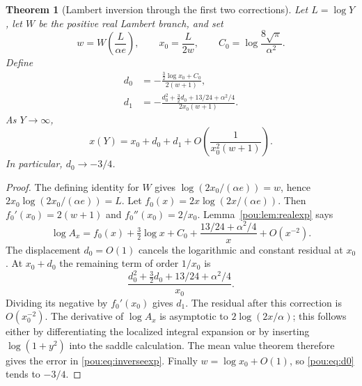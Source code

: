 \documentclass[11pt]{article}
\newtheorem{theorem}{Theorem}[section]
\theoremstyle{definition}
\theoremstyle{remark}
\begin{document}
\begin{theorem}[Lambert inversion through the first two corrections]
\label{pou:thm:inverse}
Let $L=\log Y$, let $W$ be the positive real Lambert branch, and set
\begin{equation}\label{pou:eq:x0}
 w=W\left(\frac{L}{\alpha e}\right),\qquad
 x_0=\frac{L}{2w},\qquad C_0=\log\frac{8\sqrt\pi}{\alpha^2}.
\end{equation}
Define
\begin{align}
 d_0&=-\frac{\tfrac32\log x_0+C_0}{2(w+1)},\label{pou:eq:d0}\\
 d_1&=-\frac{d_0^2+\tfrac32d_0+13/24+\alpha^2/4}
                 {2x_0(w+1)}.\label{pou:eq:d1}
\end{align}
As $Y\to\infty$,
\begin{equation}\label{pou:eq:inverseexp}
 x(Y)=x_0+d_0+d_1+O\left(\frac1{x_0^2(w+1)}\right).
\end{equation}
In particular, $d_0\to-3/4$.
\end{theorem}
\begin{proof}
The defining identity for $W$ \cite{dlmfW} gives
$\log(2x_0/(\alpha e))=w$, hence
$2x_0\log(2x_0/(\alpha e))=L$.
Let $f_0(x)=2x\log(2x/(\alpha e))$.
Then $f_0'(x_0)=2(w+1)$ and $f_0''(x_0)=2/x_0$.
Lemma~\ref{pou:lem:realexp} says
\[
 \log A_x=f_0(x)+\tfrac32\log x+C_0+
             \frac{13/24+\alpha^2/4}{x}+O(x^{-2}).
\]
The displacement $d_0=O(1)$ cancels the logarithmic and constant residual
at $x_0$.  At $x_0+d_0$ the remaining term of order $1/x_0$ is
\[
 \frac{d_0^2+\tfrac32d_0+13/24+\alpha^2/4}{x_0}.
\]
Dividing its negative by $f_0'(x_0)$ gives $d_1$.
The residual after this correction is $O(x_0^{-2})$.
The derivative of $\log A_x$ is asymptotic to $2\log(2x/\alpha)$;
this follows either by differentiating the localized integral expansion
or by inserting $\log(1+y^2)$ into the saddle calculation.
The mean value theorem therefore gives the error in \eqref{pou:eq:inverseexp}.
Finally $w=\log x_0+O(1)$, so \eqref{pou:eq:d0} tends to $-3/4$.
\end{proof}
\end{document}
